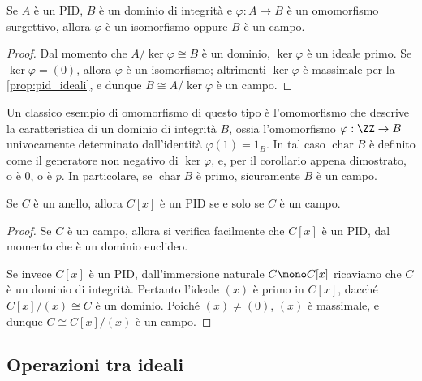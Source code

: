 \documentclass[11pt]{scrartcl}
\begin{document}
	\begin{corollary}
		Se $A$ è un PID, $B$ è un dominio di integrità e
		$\varphi: A \longrightarrow B$ è un omomorfismo surgettivo,
		allora $\varphi$ è un isomorfismo
		oppure $B$ è un campo. 
	\end{corollary}
	
	\begin{proof}
		Dal momento che $A / \ker \varphi \cong B$ è un dominio, $\ker \varphi$
		è un ideale primo. Se $\ker \varphi = (0)$, allora $\varphi$ è un
		isomorfismo; altrimenti $\ker \varphi$ è massimale per la
		\autoref{prop:pid_ideali}, e dunque $B \cong A / \ker \varphi$ è
		un campo.
	\end{proof}
	
	\begin{example}
		Un classico esempio di omomorfismo di questo tipo è l'omomorfismo che
		descrive la caratteristica di un dominio di integrità $B$, ossia
		l'omomorfismo
		$\varphi : \ZZ \to B$ univocamente determinato dall'identità
		$\varphi(1) = 1_B$. In tal caso $\operatorname{char} B$ è definito come il generatore
		non negativo di $\ker \varphi$, e, per il corollario appena dimostrato,
		o è $0$, o è $p$. In particolare, se $\operatorname{char} B$ è primo,
		sicuramente $B$ è un campo.
	\end{example}
	
	\begin{corollary}
		Se $C$ è un anello, allora $C[x]$ è un PID se e solo se $C$ è un campo.
	\end{corollary}
	
	\begin{proof}
		Se $C$ è un campo, allora si verifica facilmente che $C[x]$ è un PID,
		dal momento che è un dominio euclideo. \medskip
		
		Se invece $C[x]$ è un PID,
		dall'immersione naturale $C \mono C[x]$ ricaviamo che $C$ è un dominio di integrità. Pertanto
		l'ideale $(x)$ è primo in $C[x]$, dacché $C[x] / (x) \cong C$
		è un dominio. Poiché $(x) \neq (0)$, $(x)$ è massimale, e dunque
		$C \cong C[x] / (x)$ è un campo.
	\end{proof}
	
	\newpage
	
	\subsection{Operazioni tra ideali}
	
\end{document}
